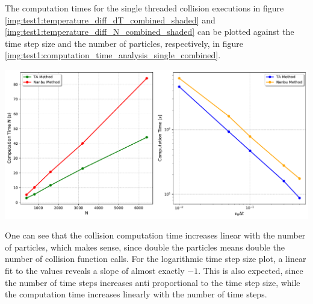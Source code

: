 The computation times for the single threaded collision executions in figure \ref{img:test1:temperature_diff_dT_combined_shaded} and \ref{img:test1:temperature_diff_N_combined_shaded} can be plotted against the time step size and the number of particles, respectively, in figure \ref{img:test1:computation_time_analysis_single_combined}. \\
\begin{minipage}[h]{\linewidth}
    \vspace{5pt}
    \centering
    \includegraphics[width=\linewidth]{ressources/test1/computation_time_analysis_single_combined.pdf}
    \label{img:test1:computation_time_analysis_single_combined}
    \vspace{5pt}
\end{minipage}
One can see that the collision computation time increases linear with the number of particles, which makes sense, since double the particles means double the number of collision function calls. For the logarithmic time step size plot, a linear fit to the values reveals a slope of almost exactly $-1$. This is also expected, since the number of time steps increases anti proportional to the time step size, while the computation time increases linearly with the number of time steps. 

